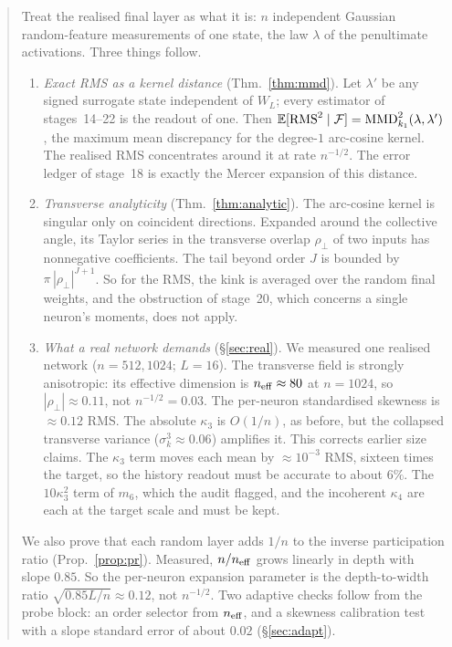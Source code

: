 \begin{abstract}
Treat the realised final layer as what it is: $n$ independent Gaussian random-feature measurements of one
state, the law $\lambda$ of the penultimate activations. Three things follow.
\begin{enumerate}[label=(\arabic*),leftmargin=1.6em,itemsep=1pt,topsep=1pt]
\item \emph{Exact RMS as a kernel distance} (Thm.~\ref{thm:mmd}). Let $\lambda'$ be any signed surrogate state
independent of $W_L$; every estimator of stages~14--22 is the readout of one. Then
$\E[\mathrm{RMS}^2\mid\mathcal F]=\mathrm{MMD}^2_{k_1}(\lambda,\lambda')$, the maximum mean discrepancy for the degree-$1$
arc-cosine kernel. The realised RMS concentrates around it at rate $n^{-1/2}$. The error ledger of stage~18 is
exactly the Mercer expansion of this distance.
\item \emph{Transverse analyticity} (Thm.~\ref{thm:analytic}). The arc-cosine kernel is singular only on
coincident directions. Expanded around the collective angle, its Taylor series in the transverse overlap
$\rho_\perp$ of two inputs has nonnegative coefficients. The tail beyond order $J$ is bounded by $\pi\,|\rho_\perp|^{J+1}$.
So for the RMS, the kink is averaged over the random final weights, and the obstruction of stage~20, which
concerns a single neuron's moments, does not apply.
\item \emph{What a real network demands} (\S\ref{sec:real}). We measured one realised network ($n=512,1024$;
$L=16$). The transverse field is strongly anisotropic: its effective dimension is $n_{\rm eff}\approx80$ at $n=1024$,
so $|\rho_\perp|\approx0.11$, not $n^{-1/2}=0.03$. The per-neuron standardised skewness is $\approx0.12$ RMS. The absolute
$\kappa_3$ is $O(1/n)$, as before, but the collapsed transverse variance ($\sigma_k^3\approx0.06$) amplifies it. This
corrects earlier size claims. The $\kappa_3$ term moves each mean by $\approx10^{-3}$ RMS, sixteen times the target,
so the history readout must be accurate to about $6\%$. The $10\kappa_3^2$ term of $m_6$, which the audit flagged,
and the incoherent $\kappa_4$ are each at the target scale and must be kept.
\end{enumerate}
We also prove that each random layer adds $1/n$ to the inverse participation ratio
(Prop.~\ref{prop:pr}). Measured, $n/n_{\rm eff}$ grows linearly in depth with slope $0.85$. So the per-neuron expansion
parameter is the depth-to-width ratio $\sqrt{0.85L/n}\approx0.12$, not $n^{-1/2}$. Two adaptive checks follow from the
probe block: an order selector from $n_{\rm eff}$, and a skewness calibration test with a slope standard error of
about $0.02$ (\S\ref{sec:adapt}).
\end{abstract}
\maketitle

